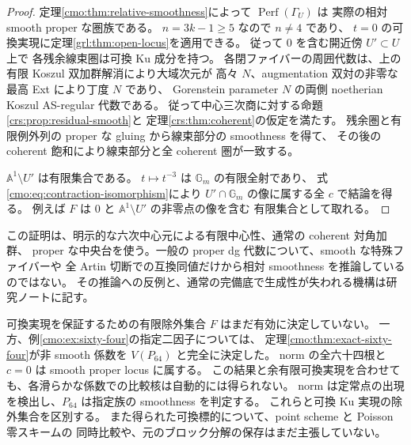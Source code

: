 \begin{proof}
定理\ref{cmo:thm:relative-smoothness}によって $\operatorname{Perf}(\Gamma_U)$ は
実際の相対 smooth proper な圏族である。
$n=3k-1\geq5$ なので $n\ne4$ であり、
$t=0$ の可換実現に定理\ref{grl:thm:open-locus}を適用できる。
従って $0$ を含む開近傍 $U'\subset U$ 上で
各残余線束圏は可換 Ku 成分を持つ。
各閉ファイバーの周囲代数は、上の有限 Koszul 双加群解消により大域次元が
高々 $N$、augmentation 双対の非零な最高 Ext により丁度 $N$ であり、
Gorenstein parameter $N$ の両側 noetherian Koszul AS-regular 代数である。
従って中心三次商に対する命題\ref{crs:prop:residual-smooth}と
定理\ref{crs:thm:coherent}の仮定を満たす。
残余圏と有限例外列の proper な gluing から線束部分の smoothness を得て、
その後の coherent 飽和により線束部分と全 coherent 圏が一致する。

$\mathbb A^1\setminus U'$ は有限集合である。
$t\mapsto t^{-3}$ は $\mathbb G_m$ の有限全射であり、
式\eqref{cmo:eq:contraction-isomorphism}により
$U'\cap\mathbb G_m$ の像に属する全 $c$ で結論を得る。
例えば $F$ は $0$ と $\mathbb A^1\setminus U'$ の非零点の像を含む
有限集合として取れる。
\end{proof}

\begin{remark}[有限中心性の役割と残る個別判定]
\label{cmo:rem:cofinite-scope}
この証明は、明示的な六次中心元による有限中心性、通常の coherent 対角加群、
proper な中央台を使う。一般の proper dg 代数について、smooth な特殊ファイバーや
全 Artin 切断での互換同値だけから相対 smoothness を推論しているのではない。
その推論への反例と、通常の完備底で生成性が失われる機構は研究ノートに記す。

可換実現を保証するための有限除外集合 $F$ はまだ有効に決定していない。
一方、例\ref{cmo:ex:sixty-four}の指定二因子については、
定理\ref{cmo:thm:exact-sixty-four}が非 smooth 係数を $V(P_{64})$ と完全に決定した。
norm の全六十四根と $c=0$ は smooth proper locus に属する。
この結果と余有限可換実現を合わせても、各滑らかな係数での比較核は自動的には得られない。
norm は定常点の出現を検出し、$P_{64}$ は指定族の smoothness を判定する。
これらと可換 Ku 実現の除外集合を区別する。
また得られた可換標的について、point scheme と Poisson 零スキームの
同時比較や、元のブロック分解の保存はまだ主張していない。
\end{remark}
